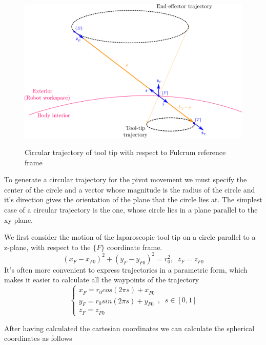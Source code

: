 \begin{center}
\begin{figure}[H]
\centering
\includegraphics[width=12cm]{images/circular-trajectory-wrt-fulcrum.png}\\
\caption{Circular trajectory of tool tip with respect to Fulcrum reference frame}
\end{figure}
\end{center}

To generate a circular trajectory for the pivot movement we must specify the center of the circle 
and a vector whose magnitude is the radius of the circle and it’s direction gives the orientation 
of the plane that the circle lies at. The simplest case of a circular trajectory is the one, 
whose circle lies in a plane parallel to the xy plane.


We first consider the motion of the laparoscopic tool tip on a circle parallel to a z-plane, with respect to the $\lbrace F \rbrace$ coordinate frame.
\begin{equation}
(x^{}_{F} - x^{}_{F0})^2 + (y^{}_{F} - y^{}_{F0})^2 = r_0^2, \;\; z^{}_{F} = z^{}_{F0}
\end{equation}
It's often more convenient to express trajectories in a parametric form, which makes it easier to calculate all the waypoints of the trajectory
\begin{equation}
\begin{cases}
x^{}_{F} = r_0cos(2πs) + x^{}_{F0} \\
y^{}_{F} = r_0sin(2πs) + y^{}_{F0} \\
z^{}_{F} = z^{}_{F0}
\end{cases} ,
\;\;
s \in [0, 1]
\end{equation}

After having calculated the cartesian coordinates we can calculate the spherical coordinates as follows

